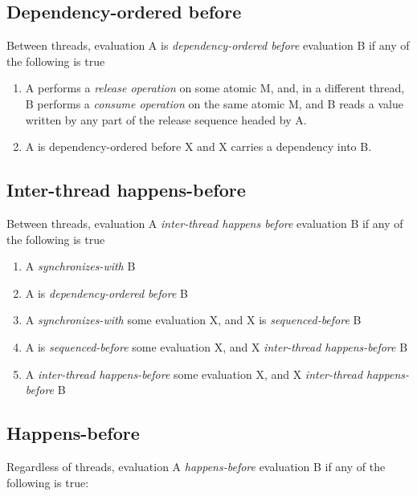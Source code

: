 \documentclass[
]{article}
\author{}
\date{}
\begin{document}
\hypertarget{dependency-ordered-before}{%
\subsection{Dependency-ordered before}\label{dependency-ordered-before}}

Between threads, evaluation A is \emph{dependency-ordered before}
evaluation B if any of the following is true

\begin{enumerate}
\def\labelenumi{\arabic{enumi})}
\item
  A performs a \emph{release operation} on some atomic M, and, in a
  different thread, B performs a \emph{consume operation} on the same
  atomic M, and B reads a value written by any part of the release
  sequence headed by A.
\item
  A is dependency-ordered before X and X carries a dependency into B.
\end{enumerate}

\hypertarget{inter-thread-happens-before}{%
\subsection{Inter-thread
happens-before}\label{inter-thread-happens-before}}

Between threads, evaluation A \emph{inter-thread happens before}
evaluation B if any of the following is true

\begin{enumerate}
\def\labelenumi{\arabic{enumi})}
\item
  A \emph{synchronizes-with} B
\item
  A is \emph{dependency-ordered before} B
\item
  A \emph{synchronizes-with} some evaluation X, and X is
  \emph{sequenced-before} B
\item
  A is \emph{sequenced-before} some evaluation X, and X
  \emph{inter-thread happens-before} B
\item
  A \emph{inter-thread happens-before} some evaluation X, and X
  \emph{inter-thread happens-before} B
\end{enumerate}

\hypertarget{happens-before}{%
\subsection{Happens-before}\label{happens-before}}

Regardless of threads, evaluation A \emph{happens-before} evaluation B
if any of the following is true:
\end{document}
